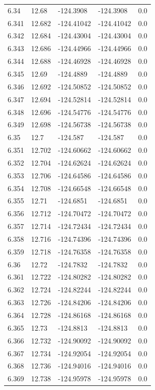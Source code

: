 \begin{tabular}{lllll}
6.34 & 12.68 & -124.3908 & -124.3908 & 0.0 \\
6.341 & 12.682 & -124.41042 & -124.41042 & 0.0 \\
6.342 & 12.684 & -124.43004 & -124.43004 & 0.0 \\
6.343 & 12.686 & -124.44966 & -124.44966 & 0.0 \\
6.344 & 12.688 & -124.46928 & -124.46928 & 0.0 \\
6.345 & 12.69 & -124.4889 & -124.4889 & 0.0 \\
6.346 & 12.692 & -124.50852 & -124.50852 & 0.0 \\
6.347 & 12.694 & -124.52814 & -124.52814 & 0.0 \\
6.348 & 12.696 & -124.54776 & -124.54776 & 0.0 \\
6.349 & 12.698 & -124.56738 & -124.56738 & 0.0 \\
6.35 & 12.7 & -124.587 & -124.587 & 0.0 \\
6.351 & 12.702 & -124.60662 & -124.60662 & 0.0 \\
6.352 & 12.704 & -124.62624 & -124.62624 & 0.0 \\
6.353 & 12.706 & -124.64586 & -124.64586 & 0.0 \\
6.354 & 12.708 & -124.66548 & -124.66548 & 0.0 \\
6.355 & 12.71 & -124.6851 & -124.6851 & 0.0 \\
6.356 & 12.712 & -124.70472 & -124.70472 & 0.0 \\
6.357 & 12.714 & -124.72434 & -124.72434 & 0.0 \\
6.358 & 12.716 & -124.74396 & -124.74396 & 0.0 \\
6.359 & 12.718 & -124.76358 & -124.76358 & 0.0 \\
6.36 & 12.72 & -124.7832 & -124.7832 & 0.0 \\
6.361 & 12.722 & -124.80282 & -124.80282 & 0.0 \\
6.362 & 12.724 & -124.82244 & -124.82244 & 0.0 \\
6.363 & 12.726 & -124.84206 & -124.84206 & 0.0 \\
6.364 & 12.728 & -124.86168 & -124.86168 & 0.0 \\
6.365 & 12.73 & -124.8813 & -124.8813 & 0.0 \\
6.366 & 12.732 & -124.90092 & -124.90092 & 0.0 \\
6.367 & 12.734 & -124.92054 & -124.92054 & 0.0 \\
6.368 & 12.736 & -124.94016 & -124.94016 & 0.0 \\
6.369 & 12.738 & -124.95978 & -124.95978 & 0.0 \\

\end{tabular}

